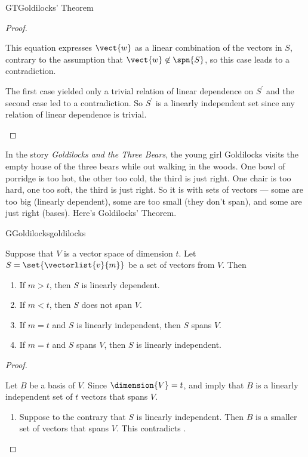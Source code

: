 \begin{subsect}{GT}{Goldilocks' Theorem}
\begin{proof}
%
\begin{para}This equation expresses $\vect{w}$ as a linear combination of the vectors in $S$, contrary to the assumption that $\vect{w}\not\in\spn{S}$, so this case leads to a contradiction.\end{para}
%
\begin{para}The first case yielded only a trivial relation of linear dependence on $S^\prime$ and the second case led to a contradiction.  So $S^\prime$ is a linearly independent set since any relation of linear dependence is trivial.\end{para}
%
\end{proof}
%
\begin{para}In the story {\sl Goldilocks and the Three Bears}, the young girl Goldilocks visits the empty house of the three bears while out walking in the woods.  One bowl of porridge is too hot, the other too cold, the third is just right.  One chair is too hard, one too soft, the third is just right.  So it is with sets of vectors --- some are too big (linearly dependent), some are too small (they don't span), and some are just right (bases).  Here's Goldilocks' Theorem.\end{para}
%
\begin{theorem}{G}{Goldilocks}{goldilocks}
\begin{para}Suppose that $V$ is a vector space of dimension $t$.  Let $S=\set{\vectorlist{v}{m}}$ be a set of vectors from $V$.  Then
\begin{enumerate}
\item  If $m>t$, then $S$ is linearly dependent.
\item  If $m<t$, then $S$ does not span $V$.
\item  If $m=t$ and $S$ is linearly independent, then $S$ spans $V$.
\item  If $m=t$ and $S$ spans $V$, then $S$ is linearly independent.
\end{enumerate}
\end{para}
\end{theorem}
%
\begin{proof}
\begin{para}Let $B$ be a basis of $V$.  Since $\dimension{V}=t$,  and  imply that $B$ is a linearly independent set of $t$ vectors that spans $V$.
\begin{enumerate}
%
\item Suppose to the contrary that $S$ is linearly independent.  Then $B$ is a smaller set of vectors that spans $V$.   This contradicts .

\end{enumerate}
\end{para}
\end{proof}
\end{subsect}
